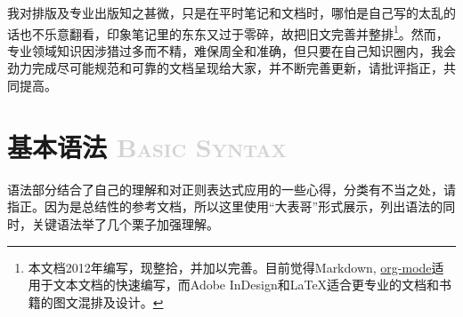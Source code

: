 \documentclass[12pt,a4paper,twoside]{ctexart}
\begin{document}
\begin{tcolorbox}[colback=yellow!5,colframe=red!80!black,title=\textbf{说明}]
  我对排版及专业出版知之甚微，只是在平时笔记和文档时，哪怕是自己写的太乱的话也不乐意翻看，印象笔记里的东东又过于零碎，故把旧文完善并整排\footnote{本文档2012年编写，现整拾，并加以完善。目前觉得Markdown, \href{http://orgmode.org/}{org-mode}适用于文本文档的快速编写，而Adobe InDesign和LaTeX适合更专业的文档和书籍的图文混排及设计。}。然而，专业领域知识因涉猎过多而不精，难保周全和准确，但只要在自己知识圈内，我会劲力完成尽可能规范和可靠的文档呈现给大家，并不断完善更新，请批评指正，共同提高。
\end{tcolorbox}

\section[基本语法]{基本语法 \textcolor{lightgray}{\textsc{Basic Syntax}}}
\label{sec:basic-syntax}

语法部分结合了自己的理解和对正则表达式应用的一些心得，分类有不当之处，请指正。因为是总结性的参考文档，所以这里使用“大表哥”形式展示，列出语法的同时，关键语法举了几个栗子加强理解。\par
\end{document}
